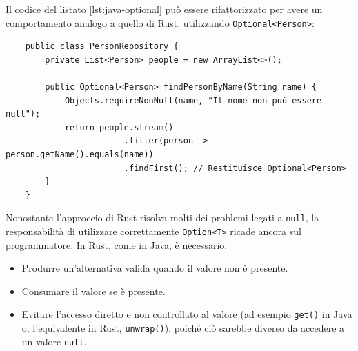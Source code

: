 Il codice del listato \ref{lst:java-optional} può essere rifattorizzato per avere un comportamento analogo a quello di Rust, utilizzando \texttt{Optional<Person>}:
\begin{verbatim}
    public class PersonRepository {
        private List<Person> people = new ArrayList<>();

        public Optional<Person> findPersonByName(String name) {
            Objects.requireNonNull(name, "Il nome non può essere null");
            return people.stream()
                        .filter(person -> person.getName().equals(name))
                        .findFirst(); // Restituisce Optional<Person>
        }
    }
\end{verbatim}
Nonostante l'approccio di Rust risolva molti dei problemi legati a \texttt{null}, la responsabilità di utilizzare correttamente \texttt{Option<T>} ricade ancora sul programmatore. In Rust, come in Java, è necessario:
\begin{itemize}
    \item Produrre un'alternativa valida quando il valore non è presente. 
    \item Consumare il valore se è presente. 
    \item Evitare l'accesso diretto  e non controllato al valore (ad esempio \texttt{get()} in Java o, l'equivalente in Rust, \texttt{unwrap()}), poiché ciò sarebbe diverso da accedere a un valore \texttt{null}.
\end{itemize}
